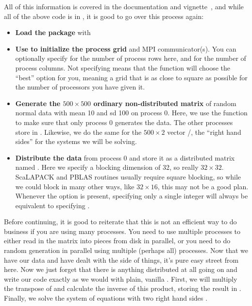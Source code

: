 All of this information is covered in the  documentation and vignette~\citep{Schmidt2012pbdBASEvignette}, and while all of the above code is in , it is good to go over this process again:
\begin{itemize}
 \item \textbf{Load the package} with 
 \item \textbf{Use  to initialize the process grid} and MPI communicator(s).  You can optionally specify  for the number of process rows here, and  for the number of process columns.  Not specifying means that the function will choose the ``best'' option for you, meaning a grid that is as close to square as possible for the number of processors you have given it.
 \item \textbf{Generate the $500\times 500$ ordinary non-distributed  matrix} of random normal data with mean 10 and sd 100 on process 0.  Here, we use the  function  to make sure that only process 0 generates the data.  The other processes store  in .  Likewise, we do the same for the $500\times 2$ vector /, the ``right hand sides'' for the systems we will be solving.
 \item \textbf{Distribute the data} from process 0 and store it as a distributed matrix named .  Here we specify a blocking dimension of 32, so really $32\times 32$.  ScaLAPACK and PBLAS routines usually require square blocking, so while we could block in many other ways, like $32\times 16$, this may not be a good plan.   Whenever the  option is present, specifying only a single integer  will always be equivalent to specifying .
\end{itemize}

Before continuing, it is good to reiterate that this is not an efficient way to do business if you are using many processes.  You need to use multiple processes to either read in the matrix into pieces from disk in parallel, or you need to do random generation in parallel using multiple (perhaps all) processes.
\np
Now that we have our data and have dealt with the  side of things, it's pure easy street from here.  Now we just forget that there is anything distributed at all going on and write our code exactly as we would with plain, vanilla .
\np
First, we will multiply the transpose of  and calculate the inverse of this product, storing the result in .  Finally, we solve the system of equations with two right hand sides .

